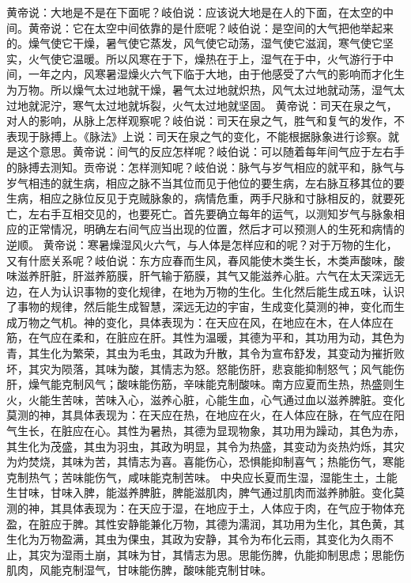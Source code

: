 \documentclass[12pt,UTF8]{ctexbook}
\begin{document}
黄帝说：大地是不是在下面呢？岐伯说：应该说大地是在人的下面，在太空的中间。黄帝说：它在太空中间依靠的是什麽呢？岐伯说：是空间的大气把他举起来的。燥气使它干燥，暑气使它蒸发，风气使它动荡，湿气使它滋润，寒气使它坚实，火气使它温暖。所以风寒在于下，燥热在于上，湿气在于中，火气游行于中间，一年之内，风寒暑湿燥火六气下临于大地，由于他感受了六气的影响而才化生为万物。所以燥气太过地就干燥，暑气太过地就炽热，风气太过地就动荡，湿气太过地就泥泞，寒气太过地就坼裂，火气太过地就坚固。
黄帝说：司天在泉之气，对人的影响，从脉上怎样观察呢？岐伯说：司天在泉之气，胜气和复气的发作，不表现于脉搏上。《脉法》上说：司天在泉之气的变化，不能根据脉象进行诊察。就是这个意思。黄帝说：间气的反应怎样呢？岐伯说：可以随着每年间气应于左右手的脉搏去测知。贡帝说：怎样测知呢？岐伯说：脉气与岁气相应的就平和，脉气与岁气相违的就生病，相应之脉不当其位而见于他位的要生病，左右脉互移其位的要生病，相应之脉位反见于克贼脉象的，病情危重，两手尺脉和寸脉相反的，就要死亡，左右手互相交见的，也要死亡。首先要确立每年的运气，以测知岁气与脉象相应的正常情况，明确左右间气应当出现的位置，然后才可以预测人的生死和病情的逆顺。
黄帝说：寒暑燥湿风火六气，与人体是怎样应和的呢？对于万物的生化，又有什麽关系呢？岐伯说：东方应春而生风，春风能使木类生长，木类声酸味，酸味滋养肝脏，肝滋养筋膜，肝气输于筋膜，其气又能滋养心脏。六气在太天深远无边，在人为认识事物的变化规律，在地为万物的生化。生化然后能生成五味，认识了事物的规律，然后能生成智慧，深远无边的宇宙，生成变化莫测的神，变化而生成万物之气机。神的变化，具体表现为：在天应在风，在地应在木，在人体应在筋，在气应在柔和，在脏应在肝。其性为温暖，其德为平和，其功用为动，其色为青，其生化为繁荣，其虫为毛虫，其政为升散，其令为宣布舒发，其变动为摧折败坏，其灾为陨落，其味为酸，其情志为怒。怒能伤肝，悲哀能抑制怒气；风气能伤肝，燥气能克制风气；酸味能伤筋，辛味能克制酸味。南方应夏而生热，热盛则生火，火能生苦味，苦味入心，滋养心脏，心能生血，心气通过血以滋养脾脏。变化莫测的神，其具体表现为：在天应在热，在地应在火，在人体应在脉，在气应在阳气生长，在脏应在心。其性为暑热，其德为显现物象，其功用为躁动，其色为赤，其生化为茂盛，其虫为羽虫，其政为明显，其令为热盛，其变动为炎热灼烁，其灾为灼焚烧，其味为苦，其情志为喜。喜能伤心，恐惧能抑制喜气；热能伤气，寒能克制热气；苦味能伤气，咸味能克制苦味。
中央应长夏而生湿，湿能生土，土能生甘味，甘味入脾，能滋养脾脏，脾能滋肌肉，脾气通过肌肉而滋养肺脏。变化莫测的神，其具体表现为：在天应于湿，在地应于土，人体应于肉，在气应于物体充盈，在脏应于脾。其性安静能兼化万物，其德为濡润，其功用为生化，其色黄，其生化为万物盈满，其虫为倮虫，其政为安静，其令为布化云雨，其变化为久雨不止，其灾为湿雨土崩，其味为甘，其情志为思。思能伤脾，仇能抑制思虑；思能伤肌肉，风能克制湿气，甘味能伤脾，酸味能克制甘味。
\end{document}
